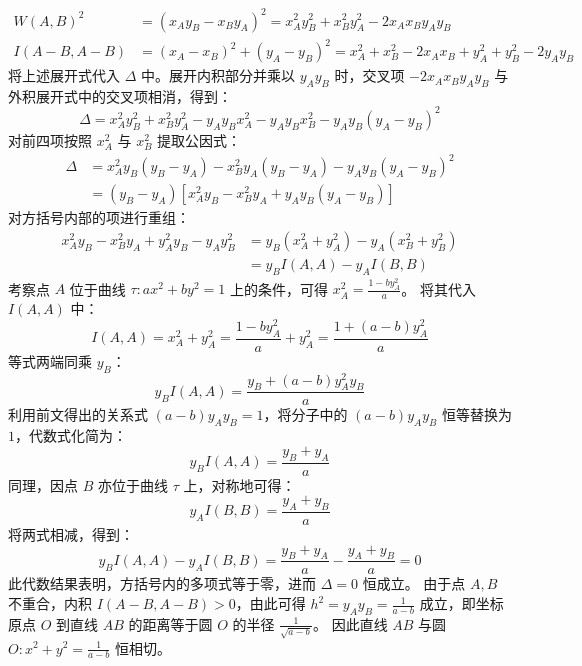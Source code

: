 \begin{solution}
\begin{align*}
W(A,B)^2 &= (x_A y_B - x_B y_A)^2 = x_A^2 y_B^2 + x_B^2 y_A^2 - 2x_A x_B y_A y_B \\
I(A-B, A-B) &= (x_A - x_B)^2 + (y_A - y_B)^2 = x_A^2 + x_B^2 - 2x_A x_B + y_A^2 + y_B^2 - 2y_A y_B
\end{align*}
将上述展开式代入 $\Delta$ 中。展开内积部分并乘以 $y_A y_B$ 时，交叉项 $-2x_A x_B y_A y_B$ 与外积展开式中的交叉项相消，得到：
\[ \Delta = x_A^2 y_B^2 + x_B^2 y_A^2 - y_A y_B x_A^2 - y_A y_B x_B^2 - y_A y_B (y_A - y_B)^2 \]
对前四项按照 $x_A^2$ 与 $x_B^2$ 提取公因式：
\begin{align*}
\Delta &= x_A^2 y_B(y_B - y_A) - x_B^2 y_A(y_B - y_A) - y_A y_B (y_A - y_B)^2 \\
&= (y_B - y_A) \left[ x_A^2 y_B - x_B^2 y_A + y_A y_B (y_A - y_B) \right]
\end{align*}
对方括号内部的项进行重组：
\begin{align*}
x_A^2 y_B - x_B^2 y_A + y_A^2 y_B - y_A y_B^2 &= y_B(x_A^2 + y_A^2) - y_A(x_B^2 + y_B^2) \\
&= y_B I(A,A) - y_A I(B,B)
\end{align*}
考察点 $A$ 位于曲线 $\tau: ax^2 + by^2 = 1$ 上的条件，可得 $x_A^2 = \frac{1 - by_A^2}{a}$。
将其代入 $I(A,A)$ 中：
\[ I(A,A) = x_A^2 + y_A^2 = \frac{1 - by_A^2}{a} + y_A^2 = \frac{1 + (a - b)y_A^2}{a} \]
等式两端同乘 $y_B$：
\[ y_B I(A,A) = \frac{y_B + (a - b)y_A^2 y_B}{a} \]
利用前文得出的关系式 $(a - b)y_A y_B = 1$，将分子中的 $(a - b)y_A y_B$ 恒等替换为 $1$，代数式化简为：
\[ y_B I(A,A) = \frac{y_B + y_A}{a} \]
同理，因点 $B$ 亦位于曲线 $\tau$ 上，对称地可得：
\[ y_A I(B,B) = \frac{y_A + y_B}{a} \]
将两式相减，得到：
\[ y_B I(A,A) - y_A I(B,B) = \frac{y_B + y_A}{a} - \frac{y_A + y_B}{a} = 0 \]
此代数结果表明，方括号内的多项式等于零，进而 $\Delta = 0$ 恒成立。
由于点 $A, B$ 不重合，内积 $I(A-B, A-B) > 0$，由此可得 $h^2 = y_A y_B = \frac{1}{a - b}$ 成立，即坐标原点 $O$ 到直线 $AB$ 的距离等于圆 $O$ 的半径 $\frac{1}{\sqrt{a - b}}$。
因此直线 $AB$ 与圆 $O: x^2 + y^2 = \frac{1}{a - b}$ 恒相切。
\end{solution}



